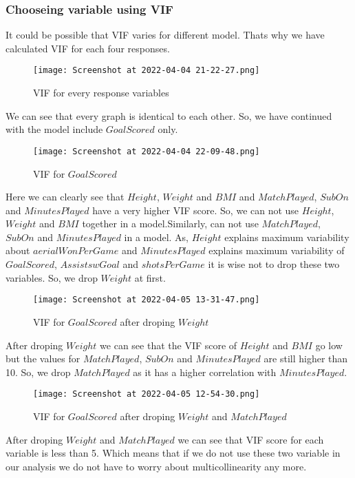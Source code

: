 \documentclass[12pt]{article}
\begin{document}
 \subsubsection{Chooseing variable using VIF}
 It could be possible that VIF varies for different model. Thats why we have calculated VIF for each four responses.
	\begin{figure}[H]
		\centering
		\texttt{[image: Screenshot at 2022-04-04 21-22-27.png]}
		\caption{ VIF for every response variables }
		\label{fig:1}
	\end{figure} 
We can see that every graph is identical to each other. So, we have continued with the model include $ GoalScored $ only.
\begin{figure}[H]
	\centering
	\texttt{[image: Screenshot at 2022-04-04 22-09-48.png]}
	\caption{ VIF for $ GoalScored $ }
	\label{fig:1}
\end{figure} 
Here we can clearly see that $ Height $, $ Weight $ and $ BMI $ and $ MatchPlayed $, $ SubOn $ and $ MinutesPlayed $ have a very higher VIF score. So, we can not use $ Height $, $ Weight $ and $ BMI $ together in a model.Similarly, can not use  $ MatchPlayed $, $ SubOn $ and $ MinutesPlayed $ in a model. As, $ Height $ explains maximum variability about $ aerialWonPerGame $ and $ MinutesPlayed $ explains maximum variability of $ GoalScored $, $ AssistswGoal $ and $ shotsPerGame $ it is wise not to drop these two variables. So, we drop $ Weight $ at first.

\begin{figure}[H]
	\centering
	\texttt{[image: Screenshot at 2022-04-05 13-31-47.png]}
	\caption{ VIF for $ GoalScored $ after droping $ Weight $ }
	\label{fig:1}
\end{figure} 

After droping $ Weight $ we can see that the VIF score of $ Height $ and $ BMI $ go low but the values for $ MatchPlayed $, $ SubOn $ and $ MinutesPlayed $ are still higher than 10. So, we drop $ MatchPlayed $ as it has a higher correlation with $ MinutesPlayed $.

\begin{figure}[H]
	\centering
	\texttt{[image: Screenshot at 2022-04-05 12-54-30.png]}
	\caption{ VIF for $ GoalScored $ after droping $ Weight $ and $ MatchPlayed $}
	\label{fig:1}
\end{figure} 

After droping $ Weight $ and $ MatchPlayed $ we can see that VIF score for each variable is less than 5. Which means that if we do not use these two variable in our analysis we do not have to worry about multicollinearity any more.
\end{document}

